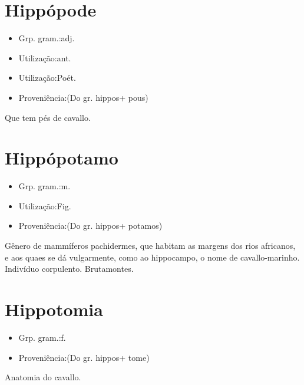 \documentclass{article}
\begin{document}
\section{Hippópode}
\begin{itemize}
\item {Grp. gram.:adj.}
\end{itemize}
\begin{itemize}
\item {Utilização:ant.}
\end{itemize}
\begin{itemize}
\item {Utilização:Poét.}
\end{itemize}
\begin{itemize}
\item {Proveniência:(Do gr. \textunderscore hippos\textunderscore  + \textunderscore pous\textunderscore )}
\end{itemize}
Que tem pés de cavallo.
\section{Hippópotamo}
\begin{itemize}
\item {Grp. gram.:m.}
\end{itemize}
\begin{itemize}
\item {Utilização:Fig.}
\end{itemize}
\begin{itemize}
\item {Proveniência:(Do gr. \textunderscore hippos\textunderscore  + \textunderscore potamos\textunderscore )}
\end{itemize}
Gênero de mammíferos pachidermes, que habitam as margens dos rios africanos, e aos quaes se dá vulgarmente, como ao hippocampo, o nome de \textunderscore cavallo-marinho\textunderscore .
Indivíduo corpulento.
Brutamontes.
\section{Hippotomia}
\begin{itemize}
\item {Grp. gram.:f.}
\end{itemize}
\begin{itemize}
\item {Proveniência:(Do gr. \textunderscore hippos\textunderscore  + \textunderscore tome\textunderscore )}
\end{itemize}
Anatomia do cavallo.
\end{document}
